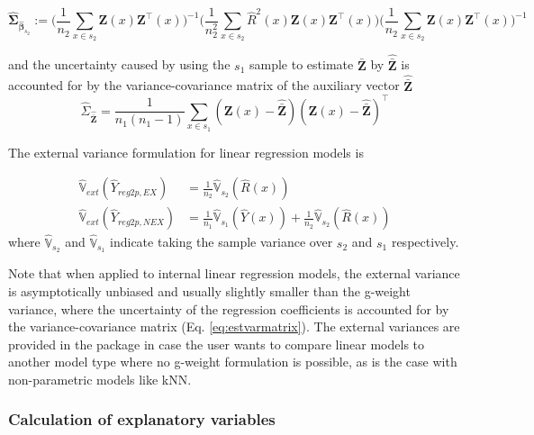 \documentclass[article]{jss}
\newcommand{\var}{\mathbb{V}}
\begin{document}
\begin{equation}\label{eq:estvarmatrix}
  \hat{\pmb{\Sigma}}_{\hat{\pmb{\beta}}_{s_2}}:=\Big(\frac{1}{n_2}\sum_{x\in{s_2}}\pmb{Z}(x)\pmb{Z}^{\top}(x) \Big)^{-1}
  \Big(\frac{1}{n_2^2}\sum_{x\in{s_2}}\hat{R}^2(x)\pmb{Z}(x)\pmb{Z}^{\top}(x)\Big)
  \Big(\frac{1}{n_2}\sum_{x\in{s_2}}\pmb{Z}(x)\pmb{Z}^{\top}(x) \Big)^{-1}
\end{equation}

and the uncertainty caused by using the $s_1$ sample to estimate $\bar{\pmb{Z}}$ by $\hat{\bar{\pmb{Z}}}$ is accounted for by the variance-covariance matrix of the auxiliary vector $\hat{\bar{\pmb{Z}}}$
\begin{equation}\label{estvarcovaux}
\hat{\Sigma}_{\hat{\bar{\pmb{Z}}}}=
\frac{1}{n_{1}(n_{1}-1)}\sum_{x\in{s_{1}}}
(\pmb{Z}(x)-\hat{\bar{\pmb{Z}}})(\pmb{Z}(x)-\hat{\bar{\pmb{Z}}})^{\top}
\end{equation}

The external variance formulation for linear regression models is

\begin{subequations}\label{eq:varexternal_2p_reg}
\begin{align}
  \hat{\var}_{ext}(\hat{Y}_{reg2p,EX}) & = \frac{1}{n_2}\hat{\var}_{s_2}(\hat{R}(x)) \label{eq:varexternal_2p_reg_ex} \\
  \hat{\var}_{ext}(\hat{Y}_{reg2p,NEX}) & = \frac{1}{n_1}\hat{\var}_{s_1}(\hat{Y}(x)) + \frac{1}{n_2}\hat{\var}_{s_2}(\hat{R}(x)) \nonumber  \label{eq:varexternal_2p_reg_nex}
\end{align}
\end{subequations}
where $\hat{\var}_{s_2}$ and $\hat{\var}_{s_1}$ indicate taking the sample variance over $s_2$ and $s_1$ respectively.

Note that when applied to internal linear regression models, the external variance is asymptotically unbiased and usually slightly smaller than the g-weight variance, where the uncertainty of the regression coefficients is accounted for by the variance-covariance matrix (Eq. \ref{eq:estvarmatrix}).  The external variances are provided in the package  in case the user wants to compare linear models to another model type where no g-weight formulation is possible, as is the case with non-parametric models like kNN.

\subsubsection{Calculation of explanatory variables}
\end{document}
